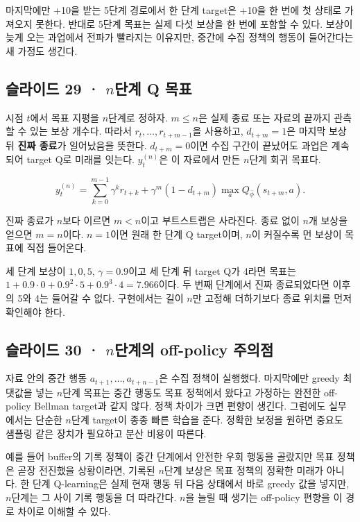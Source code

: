 \documentclass[11pt,a4paper]{article}
\begin{document}
마지막에만 +10을 받는 5단계 경로에서 한 단계 target은 +10을 한 번에 첫 상태로 가져오지 못한다. 반대로 5단계 목표는 실제 다섯 보상을 한 번에 포함할 수 있다. 보상이 늦게 오는 과업에서 전파가 빨라지는 이유지만, 중간에 수집 정책의 행동이 들어간다는 새 가정도 생긴다.\par

\subsection{슬라이드 29 · $n$단계 Q 목표}

시점 $t$에서 목표 지평을 $n$단계로 정하자. $m\le n$은 실제 종료 또는 자료의 끝까지 관측할 수 있는 보상 개수다. 따라서 $r_t,\ldots,r_{t+m-1}$을 사용하고, $d_{t+m}=1$은 마지막 보상 뒤 \textbf{진짜 종료}가 일어났음을 뜻한다. $d_{t+m}=0$이면 수집 구간이 끝났어도 과업은 계속되어 target Q로 미래를 잇는다. $y_t^{(n)}$은 이 자료에서 만든 $n$단계 회귀 목표다.\par

\[
y_t^{(n)}=\sum_{k=0}^{m-1}\gamma^k r_{t+k}
+\gamma^m(1-d_{t+m})\max_a Q_{\bar\phi}(s_{t+m},a).
\]

진짜 종료가 $n$보다 이르면 $m<n$이고 부트스트랩은 사라진다. 종료 없이 $n$개 보상을 얻으면 $m=n$이다. $n=1$이면 원래 한 단계 Q target이며, $n$이 커질수록 먼 보상이 목표에 직접 들어온다.\par

세 단계 보상이 $1,0,5$, $\gamma=0.9$이고 세 단계 뒤 target Q가 4라면 목표는 $1+0.9\cdot0+0.9^2\cdot5+0.9^3\cdot4=7.966$이다. 두 번째 단계에서 진짜 종료되었다면 이후의 5와 4는 들어갈 수 없다. 구현에서는 길이 $n$만 고정해 더하기보다 종료 위치를 먼저 확인해야 한다.\par

\subsection{슬라이드 30 · $n$단계의 off-policy 주의점}

자료 안의 중간 행동 $a_{t+1},\ldots,a_{t+n-1}$은 수집 정책이 실행했다. 마지막에만 greedy 최댓값을 넣는 $n$단계 목표는 중간 행동도 목표 정책에서 왔다고 가정하는 완전한 off-policy Bellman target과 같지 않다. 정책 차이가 크면 편향이 생긴다. 그럼에도 실무에서는 단순한 $n$단계 target이 종종 빠른 학습을 준다. 정확한 보정을 원하면 중요도 샘플링 같은 장치가 필요하고 분산 비용이 따른다.\par

예를 들어 buffer의 기록 정책이 중간 단계에서 안전한 우회 행동을 골랐지만 목표 정책은 곧장 전진했을 상황이라면, 기록된 $n$단계 보상은 목표 정책의 정확한 미래가 아니다. 한 단계 Q-learning은 실제 현재 행동 뒤 다음 상태에서 바로 greedy 값을 넣지만, $n$단계는 그 사이 기록 행동을 더 따라간다. $n$을 늘릴 때 생기는 off-policy 편향을 이 경로 차이로 이해할 수 있다.\par
\end{document}
